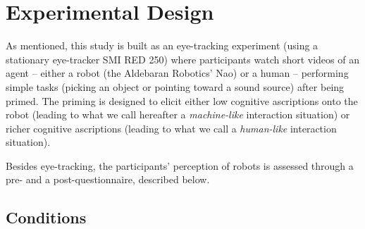 \documentclass[lettersize, noapacite, twoside, HRI]{apa_HRI}
\newcommand{\h}[1]{\textbf{H#1}\xspace}
\begin{document}
%
%
%
%
%
%
%


\section{Experimental Design}
\label{sec:design}

As mentioned, this study is built as an eye-tracking experiment (using a stationary
eye-tracker SMI RED 250) where participants watch short videos of an agent --
either a robot (the Aldebaran Robotics' Nao) or a human -- performing simple tasks
(picking an object or pointing toward a sound source) after being primed.  The
priming is designed to elicit either low cognitive ascriptions onto the robot
(leading to what we call hereafter a \emph{machine-like} interaction situation)
or richer cognitive ascriptions (leading to what we call a \emph{human-like}
interaction situation).

Besides eye-tracking, the participants' perception of robots is assessed through a
pre- and a post-questionnaire, described below.

\subsection{Conditions}
\end{document}
